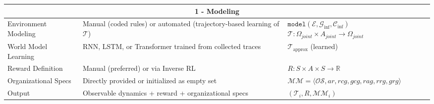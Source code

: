 \begin{table}[h!]
\begin{footnotesize}
\begin{tabular}{|p{3cm}|p{6cm}|p{3cm}|}
            \multicolumn{3}{|c|}{\textbf{1 - Modeling}}                                                                                                                                                                                                                                    \\ \hline
            Environment Modeling          & Manual (coded rules) or automated (trajectory-based learning of $\mathcal{T}$) & $\texttt{model}(\mathcal{E}, \mathcal{G}_{\text{inf}}, \mathcal{C}_{\text{inf}})$ \newline $\mathcal{T} : \Omega_{joint} \times A_{joint} \to \Omega_{joint}$ \\ \hline
            World Model Learning          & RNN, LSTM, or Transformer trained from collected traces                        & $\mathcal{T}_{\text{approx}}$ (learned)                                                                                                                       \\ \hline
            Reward Definition             & Manual (preferred) or via Inverse RL                                           & $R : S \times A \times S \to \mathbb{R}$                                                                                                                      \\ \hline
            Organizational Specs          & Directly provided or initialized as empty set                                  & $\mathcal{MM} = \langle \mathcal{OS}, \allowbreak ar, \allowbreak rcg, \allowbreak gcg, rag, \allowbreak rrg, \allowbreak grg \rangle$                        \\ \hline
            Output                        & Observable dynamics + reward + organizational specs                            & $(\mathcal{T}_i, R, \mathcal{MM}_i)$                                                                                                                          \\ \hline


\end{tabular}
\end{footnotesize}
\end{table}
